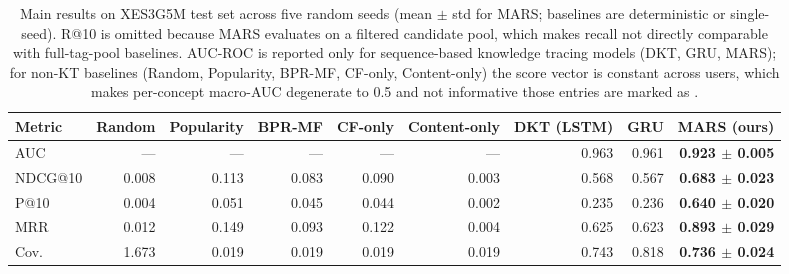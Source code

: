 \begin{table}[t]
\centering
\caption{Main results on XES3G5M test set across five random seeds (mean $\pm$ std for MARS; baselines are deterministic or single-seed). R@10 is omitted because MARS evaluates on a filtered candidate pool, which makes recall not directly comparable with full-tag-pool baselines. AUC-ROC is reported only for sequence-based knowledge tracing models (DKT, GRU, MARS); for non-KT baselines (Random, Popularity, BPR-MF, CF-only, Content-only) the score vector is constant across users, which makes per-concept macro-AUC degenerate to 0.5 and not informative \textemdash{} those entries are marked as \textemdash.}
\label{tab:main_results}
\begin{tabular}{lrrrrrrrr}
\toprule
Metric & Random & Popularity & BPR-MF & CF-only & Content-only & DKT (LSTM) & GRU & MARS (ours) \\
\midrule
AUC & --- & --- & --- & --- & --- & 0.963 & 0.961 & \textbf{0.923 $\pm$ 0.005} \\
NDCG@10 & 0.008 & 0.113 & 0.083 & 0.090 & 0.003 & 0.568 & 0.567 & \textbf{0.683 $\pm$ 0.023} \\
P@10 & 0.004 & 0.051 & 0.045 & 0.044 & 0.002 & 0.235 & 0.236 & \textbf{0.640 $\pm$ 0.020} \\
MRR & 0.012 & 0.149 & 0.093 & 0.122 & 0.004 & 0.625 & 0.623 & \textbf{0.893 $\pm$ 0.029} \\
Cov. & 1.673 & 0.019 & 0.019 & 0.019 & 0.019 & 0.743 & 0.818 & \textbf{0.736 $\pm$ 0.024} \\
\bottomrule
\end{tabular}
\end{table}
